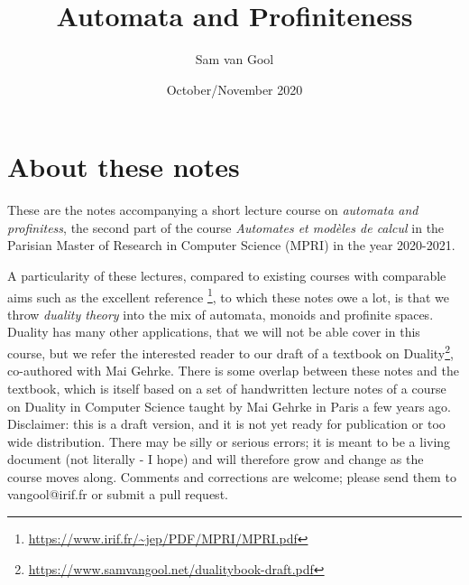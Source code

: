 
\title{Automata and Profiniteness}
\author{Sam van Gool}
\date{October/November 2020}
\maketitle

\section*{About these notes}
These are the notes accompanying a short lecture course on \emph{automata and profinitess}, the second part of the course \emph{Automates et mod\`eles de calcul} in the Parisian Master of Research in Computer Science (MPRI) in the year 2020-2021.


A particularity of these lectures, compared to existing courses with comparable aims such as the excellent reference \cite{JEP-MPRI}\footnote{\url{https://www.irif.fr/~jep/PDF/MPRI/MPRI.pdf}}, to which these notes owe a lot, is that we throw \emph{duality theory} into the mix of automata, monoids and profinite spaces. 
Duality has many other applications, that we will not be able cover in this course, but we refer the interested reader to our draft \cite{thebook} of a textbook on Duality\footnote{\url{https://www.samvangool.net/dualitybook-draft.pdf}}, co-authored with Mai Gehrke.
There is some overlap between these notes and the textbook, which is itself  based on a set of handwritten lecture notes of a course on Duality in Computer Science taught by Mai Gehrke in Paris a few years ago.\\


Disclaimer: this is a draft version, and it is not yet ready for publication or too wide distribution. There may be silly or serious errors; it is meant to be a living document (not literally - I hope) and will therefore grow and change as the course moves along. Comments and corrections are welcome; please send them to vangool@irif.fr or submit a pull request.

